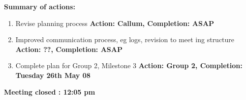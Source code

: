 \documentclass{letter}
\begin{document}
\textbf{Summary of actions:}
\begin{enumerate}
  \item Revise planning process \textbf{Action: Callum, Completion: ASAP}
  \item Improved communication process, eg logs, revision to meet
 ing structure \textbf{Action: ??, Completion: ASAP}
  \item Complete plan for Group 2, Milestone 3 \textbf{Action: Group 2,
  Completion: Tuesday 26th May 08}
\end{enumerate}
 
\textbf{Meeting closed : 12:05 pm }
\end{document}

